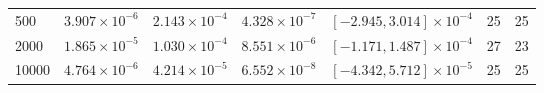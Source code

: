 \begin{tabular}{lllllll}
500 & $3.907\times10^{-6}$ & $2.143\times10^{-4}$ & $4.328\times10^{-7}$ & $[-2.945,3.014]\times10^{-4}$ & 25 & 25 \\
2000 & $1.865\times10^{-5}$ & $1.030\times10^{-4}$ & $8.551\times10^{-6}$ & $[-1.171,1.487]\times10^{-4}$ & 27 & 23 \\
10000 & $4.764\times10^{-6}$ & $4.214\times10^{-5}$ & $6.552\times10^{-8}$ & $[-4.342,5.712]\times10^{-5}$ & 25 & 25 \\
\end{tabular}
